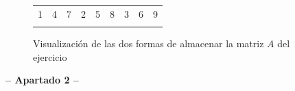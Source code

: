 \documentclass[a4paper]{report}
\begin{document}
\begin{figure}[h]
{        \begin{tabular}{!{\vrule width 1.5pt}>{}c|>{}c|>{}c!{\vrule width 1.5pt}>{}c|>{}c|>{}c!{\vrule width 1.5pt}>{}c|>{}c|>{}c!{\vrule width 1.5pt}}
            1 & 4 & 7 & 2 & 5 & 8 & 3 & 6 & 9 \\
        \end{tabular}
    }
    \caption{Visualización de las dos formas de almacenar la matriz $A$ del ejercicio}
\end{figure}


\begin{center}
    \Large\textbf{-- Apartado 2 --}
\end{center}

\section{}
\end{document}
